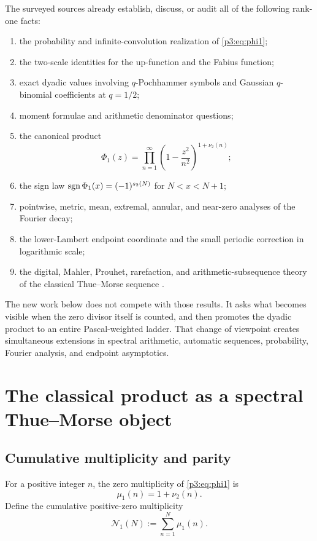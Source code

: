 \documentclass[11pt,oneside]{article}
\theoremstyle{definition}
\theoremstyle{remark}
\begin{document}
The surveyed sources \cite{p3:repo-primary,p3:repo-frontiers,p3:arias1982,p3:arias2018} already establish, discuss, or audit all of the following rank-one facts:
\begin{enumerate}[label=(\alph*)]
\item the probability and infinite-convolution realization of \eqref{p3:eq:phi1};
\item the two-scale identities for the up-function and the Fabius function;
\item exact dyadic values involving $q$-Pochhammer symbols and Gaussian $q$-binomial coefficients at $q=1/2$;
\item moment formulae and arithmetic denominator questions;
\item the canonical product
\[
  \Phi_1(z)=\prod_{n=1}^{\infty}\left(1-\frac{z^2}{n^2}\right)^{1+\nu_2(n)};
\]
\item the sign law $\operatorname{sgn}\Phi_1(x)=(-1)^{s_2(N)}$ for $N<x<N+1$;
\item pointwise, metric, mean, extremal, annular, and near-zero analyses of the Fourier decay;
\item the lower-Lambert endpoint coordinate and the small periodic correction in logarithmic scale;
\item the digital, Mahler, Prouhet, rarefaction, and arithmetic-subsequence theory of the classical Thue--Morse sequence \cite{p3:allouche-shallit-1999,p3:automatic-sequences,p3:toth2022}.
\end{enumerate}

The new work below does not compete with those results.  It asks what becomes visible when the zero divisor itself is counted, and then promotes the dyadic product to an entire Pascal-weighted ladder.  That change of viewpoint creates simultaneous extensions in spectral arithmetic, automatic sequences, probability, Fourier analysis, and endpoint asymptotics.

\section{The classical product as a spectral Thue--Morse object}\label{p3:sec:classical-spectral}

\subsection{Cumulative multiplicity and parity}

For a positive integer $n$, the zero multiplicity of \eqref{p3:eq:phi1} is
\[
  \mu_1(n)=1+\nu_2(n).
\]
Define the cumulative positive-zero multiplicity
\[
  \mathcal N_1(N):=\sum_{n=1}^{N}\mu_1(n).
\]
\end{document}
